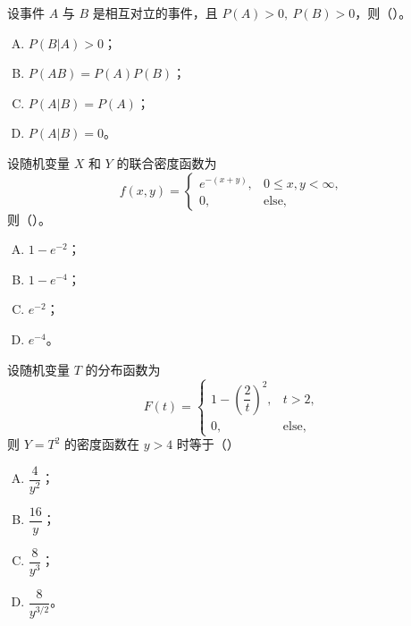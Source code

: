 \begin{homework}[1]
设事件 $A$ 与 $B$ 是相互对立的事件，且 $P(A)>0,\ P(B)>0$，则（\hfill）。

\begin{enumerate}[(A)]
  \item $P(B|A)>0$；
  \item $P(AB)=P(A)P(B)$；
  \item $P(A|B)=P(A)$；
  \item $P(A|B)=0$。
\end{enumerate}
\end{homework}

\begin{homework}[2]
设随机变量 $X$ 和 $Y$ 的联合密度函数为
\[
f(x,y)=
\begin{cases}
e^{-(x+y)}, & 0\le x,y<\infty,\\[2pt]
0, & \text{else},
\end{cases}
\]
则（\hfill）。
\end{homework}
\begin{enumerate}[(A)]
  \item $1-e^{-2}$；
  \item $1-e^{-4}$；
  \item $e^{-2}$；
  \item $e^{-4}$。
\end{enumerate}
\begin{homework}[3]
设随机变量 $T$ 的分布函数为
\[
F(t)=
\begin{cases}
1-\left(\dfrac{2}{t}\right)^2, & t>2,\\[4pt]
0, & \text{else},
\end{cases}
\]
则 $Y=T^2$ 的密度函数在 $y>4$ 时等于（\hfill）

\begin{enumerate}[(A)]
  \item $\dfrac{4}{y^{2}}$；
  \item $\dfrac{16}{y}$；
  \item $\dfrac{8}{y^{3}}$；
  \item $\dfrac{8}{y^{3/2}}$。
\end{enumerate}
\end{homework}

